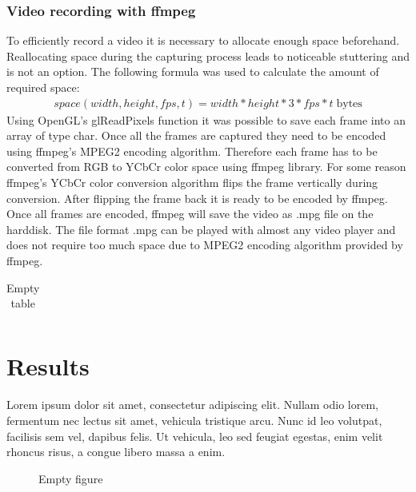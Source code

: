 \documentclass[11pt,a4paper,twoside,openright]{report}
\begin{document}
\subsection{Video recording with ffmpeg}
To efficiently record a video it is necessary to allocate enough space beforehand. Reallocating space during the capturing process leads to noticeable stuttering and is not an option. The following formula was used to calculate the amount of required space:
\begin{align*}
space(width, height, fps, t) = width * height * 3 * fps * t \; \mathrm{bytes}
\end{align*}
Using OpenGL's glReadPixels function it was possible to save each frame into an array of type char. Once all the frames are captured they need to be encoded using ffmpeg's MPEG2 encoding algorithm. Therefore each frame has to be converted from RGB to YCbCr color space using ffmpeg library. For some reason ffmpeg's YCbCr color conversion algorithm flips the frame vertically during conversion. After flipping the frame back it is ready to be encoded by ffmpeg. Once all frames are encoded, ffmpeg will save the video as .mpg file on the harddisk. The file format .mpg can be played with almost any video player and does not require too much space due to MPEG2 encoding algorithm provided by ffmpeg.

\begin{table}
\caption{Empty table}
\begin{tabular}{|ccc|}

\end{tabular}
\end{table}

\chapter{Results}
\label{sec:results}

Lorem ipsum dolor sit amet, consectetur adipiscing elit. Nullam odio lorem, fermentum nec lectus sit amet, vehicula tristique arcu. Nunc id leo volutpat, facilisis sem vel, dapibus felis. Ut vehicula, leo sed feugiat egestas, enim velit rhoncus risus, a congue libero massa a enim.

\begin{figure}
\caption{Empty figure}
\end{figure}

\end{document}
